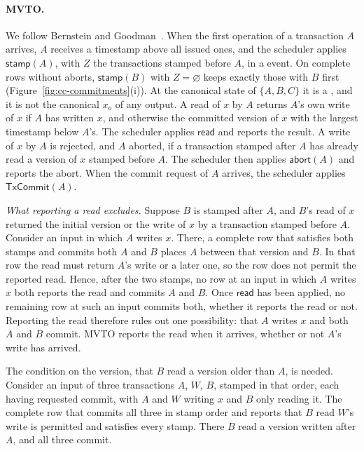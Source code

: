 \paragraph{MVTO.}
We follow Bernstein and Goodman~\cite{bernstein1981concurrency}.  When the
first operation of a transaction $A$ arrives, $A$ receives a timestamp above
all issued ones, and the scheduler applies $\mathsf{stamp}(A)$, with $Z$ the
transactions stamped before $A$, in a \commitment event.  On complete rows
without aborts, $\mathsf{stamp}(B)$ with $Z=\varnothing$ keeps exactly those
with $B$ first (Figure~\ref{fig:cc-commitments}(i)).  At the canonical state
of $\{A,B,C\}$ it is a \commitment, and it is not the canonical \commitment
$x_o$ of any output.  A read of $x$ by $A$ returns $A$'s own write of $x$ if
$A$ has written $x$, and otherwise the committed version of $x$ with the
largest timestamp below $A$'s.  The scheduler applies $\mathsf{read}$ and
reports the result.  A write of $x$ by $A$ is rejected, and $A$ aborted, if a
transaction stamped after $A$ has already read a version of $x$ stamped before
$A$.  The scheduler then applies $\mathsf{abort}(A)$ and reports the abort.
When the commit request of $A$ arrives, the scheduler applies
$\mathsf{TxCommit}(A)$.

\emph{What reporting a read excludes.}  Suppose $B$ is stamped after $A$, and
$B$'s read of $x$ returned the initial version or the write of $x$ by a
transaction stamped before $A$.  Consider an input in which $A$ writes $x$.
There, a complete row that satisfies both stamps and commits both $A$ and $B$
places $A$ between that version and $B$.  In that row the read must return
$A$'s write or a later one, so the row does not permit the reported read.
Hence, after the two stamps, no row at an input in which $A$ writes $x$ both
reports the read and commits $A$ and $B$.  Once $\mathsf{read}$ has been
applied, no remaining row at such an input commits both, whether it reports
the read or not.  Reporting the read therefore rules out one possibility: that
$A$ writes $x$ and both $A$ and $B$ commit.  MVTO reports the read when it
arrives, whether or not $A$'s write has arrived.

The condition on the version, that $B$ read a version older than $A$, is
needed.  Consider an input of three transactions $A$, $W$, $B$, stamped in
that order, each having requested commit, with $A$ and $W$ writing $x$ and $B$
only reading it.  The complete row that commits all three in stamp order and
reports that $B$ read $W$'s write is permitted and satisfies every stamp.
There $B$ read a version written after $A$, and all three commit.

